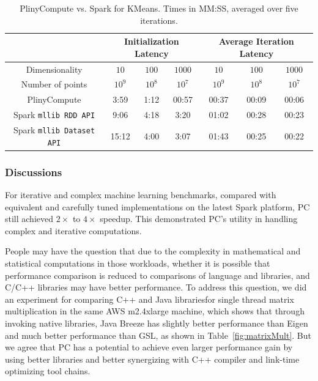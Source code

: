 \begin{table}[h!]
\begin{center}
\begin{tabular}{|c||c|c|c||c|c|c||}
\hline
& \multicolumn{3}{c||}{Initialization Latency} & \multicolumn{3}{c||}{Average
                                         Iteration Latency} \\
\hline
Dimensionality & $10$ & $100$ & $1000$ & $10$ & $100$ & $1000$\\
Number of points & $10^9$ & $10^8$ & $10^7$ & $10^9$ & $10^8$ & $10^7$\\
\hline
PlinyCompute &3:59 & 1:12 & 00:57 &00:37 & 00:09 & 00:06\\
Spark \texttt{mllib RDD API} &9:06  &4:18 &3:20 &01:02 & 00:28 & 00:23\\
Spark \texttt{mllib Dataset API} &15:12  &4:00 &3:07 &01:43 & 00:25 & 00:22\\
\hline
\end{tabular}
\caption{PlinyCompute vs. Spark for KMeans. Times in MM:SS, averaged over five iterations.}
\label{fig:KMeans}
\end{center}
\end{table}


\subsubsection{Discussions}
For iterative and complex machine learning
benchmarks, compared with equivalent and carefully tuned implementations on the latest
Spark platform, PC still achieved $2 \times$ to $4 \times$
speedup. This demonstrated PC's utility in handling
complex and iterative computations. 

\vspace{5pt}
People may have
the question that due to the complexity in mathematical and statistical
computations in those workloads, whether it is possible that performance comparison is reduced to comparisons of
language and libraries, and C/C++ libraries may have better
performance. To address this question, we did an experiment for comparing C++ and Java librariesfor
single thread matrix multiplication in the same AWS m2.4xlarge machine, which shows that through invoking
native libraries, Java Breeze has slightly better performance than Eigen and much
better performance than GSL, as shown in Table~\ref{fig:matrixMult}. But we agree that PC has a
potential to achieve even larger performance gain by using better
libraries and better
synergizing with C++ compiler and link-time optimizing tool chains.

